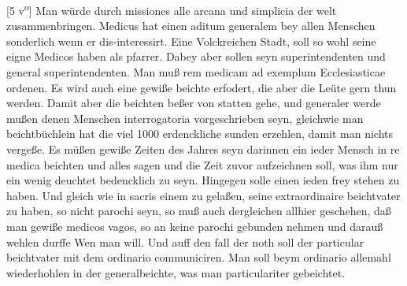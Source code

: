 [5 v\textsuperscript{o}]
\pend%
\pstart%
Man w\"{u}rde durch missiones alle arcana\protect{} und simplicia der welt zusammenbringen.
\pend%
\pstart%
Medicus\protect{} hat einen aditum generalem\protect{} bey allen Menschen sonderlich wenn er dis-interessirt.
\pend%
\pstart%
Eine
Volckreichen Stadt, soll so wohl seine eigne Medicos\protect{} haben als pfarrer. Dabey aber sollen seyn superintendenten und general superintendenten.
\pend%
\pstart%
Man mu{\ss} rem medicam\protect{} ad exemplum Ecclesiasticae ordenen.
\pend%
\pstart%
Es wird auch eine gewi{\ss}e beichte erfodert, die aber die Le\"{u}te gern thun werden.
\pend%
\pstart%
Damit aber die beichten be{\ss}er von statten gehe, und generaler werde mu{\ss}en denen Menschen interrogatoria vorgeschrieben seyn, gleichwie man beichtb\"{u}chlein hat die viel 1000 erdenckliche sunden erzehlen, damit man nichts verge{\ss}e.
\pend%
\pstart%
Es m\"{u}{\ss}en gewi{\ss}e Zeiten des Jahres seyn darinnen ein ieder Mensch in re medica\protect{} beichten und alles sagen und die Zeit zuvor aufzeichnen soll, was ihm nur ein wenig deuchtet bedencklich zu seyn.
\pend%
\pstart%
Hingegen solle einen ieden frey stehen
zu haben.
\pend%
\pstart%
Und gleich wie in sacris einem zu gela{\ss}en, seine extraordinaire beichtvater zu haben, so nicht parochi seyn, so mu{\ss} auch dergleichen allhier geschehen, da{\ss} man gewi{\ss}e medicos vagos\protect{}, so an keine parochi gebunden nehmen und darau{\ss} wehlen durffe Wen man will.
\pend%
\pstart%
Und auff den fall der noth soll der particular beichtvater mit dem ordinario communiciren.
\pend%
\pstart%
Man soll beym ordinario allemahl wiederhohlen in der generalbeichte, was man particulariter gebeichtet.%
